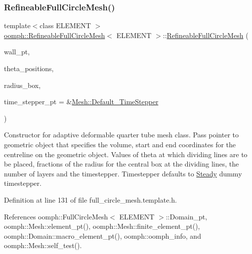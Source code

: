 \subsubsection{\texorpdfstring{Refineable\+Full\+Circle\+Mesh()}{RefineableFullCircleMesh()}}
{\footnotesize\ttfamily template$<$class E\+L\+E\+M\+E\+NT $>$ \\
\hyperlink{classoomph_1_1RefineableFullCircleMesh}{oomph\+::\+Refineable\+Full\+Circle\+Mesh}$<$ E\+L\+E\+M\+E\+NT $>$\+::\hyperlink{classoomph_1_1RefineableFullCircleMesh}{Refineable\+Full\+Circle\+Mesh} (\begin{DoxyParamCaption}\item[{\hyperlink{classoomph_1_1GeomObject}{Geom\+Object} $\ast$}]{wall\+\_\+pt,  }\item[{const \hyperlink{classoomph_1_1Vector}{Vector}$<$ double $>$ \&}]{theta\+\_\+positions,  }\item[{const \hyperlink{classoomph_1_1Vector}{Vector}$<$ double $>$ \&}]{radius\+\_\+box,  }\item[{\hyperlink{classoomph_1_1TimeStepper}{Time\+Stepper} $\ast$}]{time\+\_\+stepper\+\_\+pt = {\ttfamily \&\hyperlink{classoomph_1_1Mesh_a12243d0fee2b1fcee729ee5a4777ea10}{Mesh\+::\+Default\+\_\+\+Time\+Stepper}} }\end{DoxyParamCaption})\hspace{0.3cm}{\ttfamily [inline]}}



Constructor for adaptive deformable quarter tube mesh class. Pass pointer to geometric object that specifies the volume, start and end coordinates for the centreline on the geometric object. Values of theta at which dividing lines are to be placed, fractions of the radius for the central box at the dividing lines, the number of layers and the timestepper. Timestepper defaults to \hyperlink{classoomph_1_1Steady}{Steady} dummy timestepper. 



Definition at line 131 of file full\+\_\+circle\+\_\+mesh.\+template.\+h.



References oomph\+::\+Full\+Circle\+Mesh$<$ E\+L\+E\+M\+E\+N\+T $>$\+::\+Domain\+\_\+pt, oomph\+::\+Mesh\+::element\+\_\+pt(), oomph\+::\+Mesh\+::finite\+\_\+element\+\_\+pt(), oomph\+::\+Domain\+::macro\+\_\+element\+\_\+pt(), oomph\+::oomph\+\_\+info, and oomph\+::\+Mesh\+::self\+\_\+test().

\mbox{\label{classoomph_1_1RefineableFullCircleMesh_ac50b75d390504a37ecc8a86daebc78ee}} 
